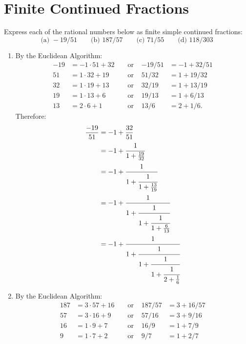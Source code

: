 \section{Finite Continued Fractions}

\begin{exercise}
    Express each of the rational numbers below as finite simple continued fractions:
    $$\text{(a) } -19/51 \qquad \text{(b) } 187/57 \qquad \text{(c) } 71/55 \qquad \text{(d) } 118/303$$
\end{exercise}

\begin{solution}
    \begin{enumerate}
        \item By the Euclidean Algorithm:
        \begin{align*}
            -19 &= -1\cdot 51 + 32 & &\text{ or } & -19/51 &= -1 + 32/51 \\
            51 &= 1\cdot 32 + 19 & &\text{ or } & 51/32 &= 1 + 19/32 \\
            32 &= 1\cdot 19 + 13 & &\text{ or } & 32/19 &= 1 + 13/19 \\
            19 &= 1\cdot 13 + 6 & &\text{ or } & 19/13 &= 1 + 6/13 \\
            13 &= 2\cdot 6 + 1 & &\text{ or } & 13/6 &= 2 + 1/6.
        \end{align*}
        Therefore:
        \begin{align*}
            \frac{-19}{51} &= -1 + \frac{32}{51} \\
            &= -1 + \cfrac{1}{1 + \frac{19}{32}} \\
            &= -1 + \cfrac{1}{1 + \cfrac{1}{1 + \frac{13}{19}}} \\
            &= -1 + \cfrac{1}{1 + \cfrac{1}{1 + \cfrac{1}{1 + \frac{6}{13}}}} \\
            &= -1 + \cfrac{1}{1 + \cfrac{1}{1 + \cfrac{1}{1 + \cfrac{1}{2 + \frac{1}{6}}}}}
        \end{align*}
        \item By the Euclidean Algorithm:
        \begin{align*}
            187 &= 3\cdot 57 + 16 & &\text{ or } & 187/57 &= 3 + 16/57 \\
            57 &= 3\cdot 16 + 9 & &\text{ or } & 57/16 &= 3 + 9/16 \\
            16 &= 1\cdot 9 + 7 & &\text{ or } & 16/9 &= 1 + 7/9 \\
            9 &= 1\cdot 7 + 2 & &\text{ or } & 9/7 &= 1 + 2/7 \\

\end{align*}
\end{enumerate}
\end{solution}
